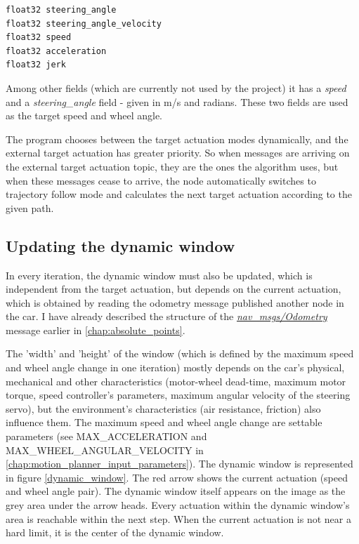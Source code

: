 \begin{minipage}{\textwidth}
\begin{lstlisting}[language=IDL]
float32 steering_angle
float32 steering_angle_velocity
float32 speed
float32 acceleration
float32 jerk
\end{lstlisting}
\end{minipage}

Among other fields (which are currently not used by the project) it has a \textit{speed} and a \textit{steering\_angle} field - given in m/s and radians. These two fields are used as the target speed and wheel angle.

The program chooses between the target actuation modes dynamically, and the external target actuation has greater priority. So when messages are arriving on the external target actuation topic, they are the ones the algorithm uses, but when these messages cease to arrive, the node automatically switches to trajectory follow mode and calculates the next target actuation according to the given path.

\subsection{Updating the dynamic window}
In every iteration, the dynamic window must also be updated, which is independent from the target actuation, but depends on the current actuation, which is obtained by reading the odometry message published another node in the car. I have already described the structure of the \href{http://docs.ros.org/melodic/api/nav_msgs/html/msg/Odometry.html}{\textit{\textit{nav\_msgs/Odometry}}} message earlier in \ref{chap:absolute_points}.

The 'width' and 'height' of the window (which is defined by the maximum speed and wheel angle change in one iteration) mostly depends on the car's physical, mechanical and other characteristics (motor-wheel dead-time, maximum motor torque, speed controller's parameters, maximum angular velocity of the steering servo), but the environment's characteristics (air resistance, friction) also influence them. The maximum speed and wheel angle change are settable parameters (see MAX\_ACCELERATION and MAX\_WHEEL\_ANGULAR\_VELOCITY in \ref{chap:motion_planner_input_parameters}). The dynamic window is represented in figure \ref{dynamic_window}. The red arrow shows the current actuation (speed and wheel angle pair). The dynamic window itself appears on the image as the grey area under the arrow heads. Every actuation within the dynamic window's area is reachable within the next step. When the current actuation is not near a hard limit, it is the center of the dynamic window.

